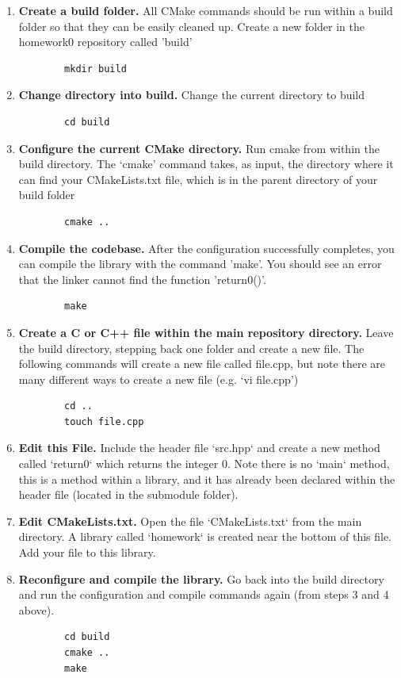 \documentclass{article} %
\begin{document}
\begin{enumerate}
    \item \textbf{Create a build folder.}  All CMake commands should be run within a build folder so that they can be easily cleaned up.  Create a new folder in the homework0 repository called 'build'
    \begin{verbatim}
        mkdir build
    \end{verbatim}

    \item \textbf{Change directory into build.}  Change the current directory to build \begin{verbatim}
        cd build
    \end{verbatim}

    \item \textbf{Configure the current CMake directory.}  Run cmake from within the build directory.  The `cmake' command takes, as input, the directory where it can find your CMakeLists.txt file, which is in the parent directory of your build folder
    \begin{verbatim}
        cmake ..
    \end{verbatim}
    

    \item \textbf{Compile the codebase.} After the configuration successfully completes, you can compile the library with the command 'make'.  You should see an error that the linker cannot find the function 'return0()'.
    \begin{verbatim}
        make
    \end{verbatim}

    \item \textbf{Create a C or C++ file within the main repository directory.}  Leave the build directory, stepping back one folder and create a new file.  The following commands will create a new file called file.cpp, but note there are many different ways to create a new file (e.g. `vi file.cpp')
    \begin{verbatim}
        cd ..
        touch file.cpp
    \end{verbatim}

    \item \textbf{Edit this File.}  Include the header file `src.hpp` and create a new method called `return0` which returns the integer 0.  Note there is no `main` method, this is a method within a library, and it has already been declared within the header file (located in the submodule folder).

    \item \textbf{Edit CMakeLists.txt.}  Open the file `CMakeLists.txt` from the main directory.  A library called `homework` is created near the bottom of this file.  Add your file to this library.

    \item \textbf{Reconfigure and compile the library.}  Go back into the build directory and run the configuration and compile commands again (from steps 3 and 4 above).
    \begin{verbatim}
        cd build
        cmake ..
        make
    \end{verbatim}
\end{enumerate}
\end{document}
